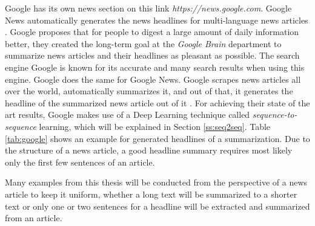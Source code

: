 Google has its own news section on this link \textit{https://news.google.com}. Google News automatically generates the news headlines for multi-language news articles \cite{google}. Google proposes that for people to digest a large amount of daily information better, they created the long-term goal at the \textit{Google Brain} department to summarize news articles and their headlines as pleasant as possible. The search engine Google is known for its accurate and many search results when using this engine. Google does the same for Google News. Google scrapes news articles all over the world, automatically summarizes it, and out of that, it generates the headline of the summarized news article out of it \cite{google}. 
For achieving their state of the art results, Google makes use of a Deep Learning technique called \textit{sequence-to-sequence} learning, which will be explained in Section \ref{ss:seq2seq}. Table \ref{tab:google} shows an example for generated headlines of a summarization. Due to the structure of a news article, a good headline summary requires most likely only the first few sentences of an article.  

Many examples from this thesis will be conducted from the perspective of a news article to keep it uniform, whether a long text will be summarized to a shorter text or only one or two sentences for a headline will be extracted and summarized from an article. 


